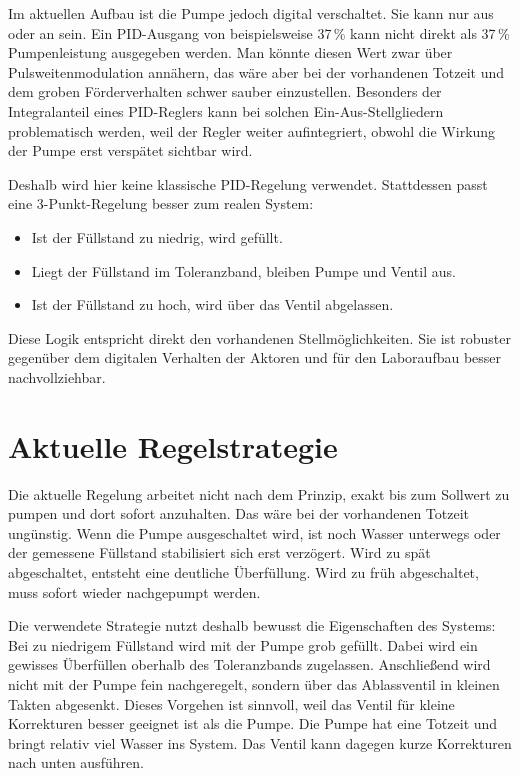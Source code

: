 \documentclass[12pt,a4paper]{scrartcl}
\newcommand{\SI}[2]{#1\,#2}
\newcommand{\percent}{\%}
\begin{document}
Im aktuellen Aufbau ist die Pumpe jedoch digital verschaltet. Sie kann nur \glqq aus\grqq{} oder \glqq an\grqq{} sein. Ein PID-Ausgang von beispielsweise \SI{37}{\percent} kann nicht direkt als \SI{37}{\percent} Pumpenleistung ausgegeben werden. Man könnte diesen Wert zwar über Pulsweitenmodulation annähern, das wäre aber bei der vorhandenen Totzeit und dem groben Förderverhalten schwer sauber einzustellen. Besonders der Integralanteil eines PID-Reglers kann bei solchen Ein-Aus-Stellgliedern problematisch werden, weil der Regler weiter aufintegriert, obwohl die Wirkung der Pumpe erst verspätet sichtbar wird.

Deshalb wird hier keine klassische PID-Regelung verwendet. Stattdessen passt eine 3-Punkt-Regelung besser zum realen System:

\begin{itemize}
  \item Ist der Füllstand zu niedrig, wird gefüllt.
  \item Liegt der Füllstand im Toleranzband, bleiben Pumpe und Ventil aus.
  \item Ist der Füllstand zu hoch, wird über das Ventil abgelassen.
\end{itemize}

Diese Logik entspricht direkt den vorhandenen Stellmöglichkeiten. Sie ist robuster gegenüber dem digitalen Verhalten der Aktoren und für den Laboraufbau besser nachvollziehbar.

\section{Aktuelle Regelstrategie}

Die aktuelle Regelung arbeitet nicht nach dem Prinzip, exakt bis zum Sollwert zu pumpen und dort sofort anzuhalten. Das wäre bei der vorhandenen Totzeit ungünstig. Wenn die Pumpe ausgeschaltet wird, ist noch Wasser unterwegs oder der gemessene Füllstand stabilisiert sich erst verzögert. Wird zu spät abgeschaltet, entsteht eine deutliche Überfüllung. Wird zu früh abgeschaltet, muss sofort wieder nachgepumpt werden.

Die verwendete Strategie nutzt deshalb bewusst die Eigenschaften des Systems: Bei zu niedrigem Füllstand wird mit der Pumpe grob gefüllt. Dabei wird ein gewisses Überfüllen oberhalb des Toleranzbands zugelassen. Anschließend wird nicht mit der Pumpe fein nachgeregelt, sondern über das Ablassventil in kleinen Takten abgesenkt. Dieses Vorgehen ist sinnvoll, weil das Ventil für kleine Korrekturen besser geeignet ist als die Pumpe. Die Pumpe hat eine Totzeit und bringt relativ viel Wasser ins System. Das Ventil kann dagegen kurze Korrekturen nach unten ausführen.
\end{document}
